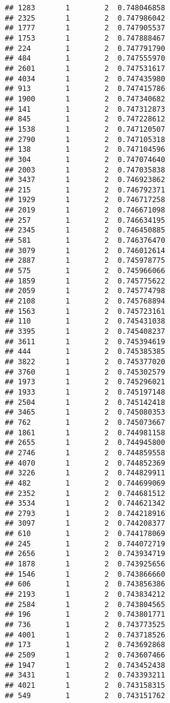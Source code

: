 \documentclass[
]{article}
\begin{document}
\begin{verbatim}
## 1283       1        2  0.748046858
## 2325       1        2  0.747986042
## 1777       1        2  0.747905537
## 1753       1        2  0.747888467
## 224        1        2  0.747791790
## 484        1        2  0.747555970
## 2601       1        2  0.747531617
## 4034       1        2  0.747435980
## 913        1        2  0.747415786
## 1900       1        2  0.747340682
## 141        1        2  0.747312873
## 845        1        2  0.747228612
## 1538       1        2  0.747120507
## 2790       1        2  0.747105318
## 138        1        2  0.747104596
## 304        1        2  0.747074640
## 2003       1        2  0.747035838
## 3437       1        2  0.746923862
## 215        1        2  0.746792371
## 1929       1        2  0.746717258
## 2019       1        2  0.746671098
## 257        1        2  0.746634195
## 2345       1        2  0.746450885
## 581        1        2  0.746376470
## 3079       1        2  0.746012614
## 2887       1        2  0.745978775
## 575        1        2  0.745966066
## 1859       1        2  0.745775622
## 2059       1        2  0.745774798
## 2108       1        2  0.745768894
## 1563       1        2  0.745723161
## 110        1        2  0.745431038
## 3395       1        2  0.745408237
## 3611       1        2  0.745394619
## 444        1        2  0.745385385
## 3822       1        2  0.745377020
## 3760       1        2  0.745302579
## 1973       1        2  0.745296021
## 1933       1        2  0.745197148
## 2504       1        2  0.745142418
## 3465       1        2  0.745080353
## 762        1        2  0.745073667
## 1861       1        2  0.744981158
## 2655       1        2  0.744945800
## 2746       1        2  0.744859558
## 4070       1        2  0.744852369
## 3226       1        2  0.744829911
## 482        1        2  0.744699069
## 2352       1        2  0.744681512
## 3534       1        2  0.744621342
## 2793       1        2  0.744218916
## 3097       1        2  0.744208377
## 610        1        2  0.744178069
## 245        1        2  0.744072719
## 2656       1        2  0.743934719
## 1878       1        2  0.743925656
## 1546       1        2  0.743866660
## 606        1        2  0.743856386
## 2193       1        2  0.743834212
## 2584       1        2  0.743804565
## 196        1        2  0.743801771
## 736        1        2  0.743773525
## 4001       1        2  0.743718526
## 173        1        2  0.743692868
## 2509       1        2  0.743607466
## 1947       1        2  0.743452438
## 3431       1        2  0.743393211
## 4021       1        2  0.743158315
## 549        1        2  0.743151762

\end{verbatim}
\end{document}
